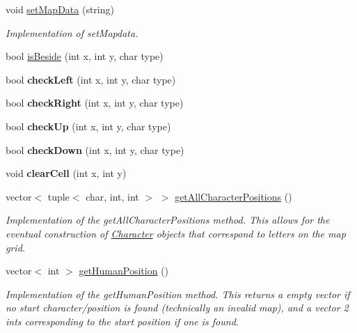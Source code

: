 \begin{DoxyCompactItemize}
void \hyperlink{class_map_a94074365bf7aaa7aef44607581f47f3e}{set\+Map\+Data} (string)
\begin{DoxyCompactList}\small\item\em Implementation of set\+Mapdata. \end{DoxyCompactList}\item 
bool \hyperlink{class_map_a7ba2837b589493924b726dc326d68e8e}{is\+Beside} (int x, int y, char type)
\item 
\hypertarget{class_map_a6f691b4374549e38a63bd0632b181287}{}\label{class_map_a6f691b4374549e38a63bd0632b181287} 
bool {\bfseries check\+Left} (int x, int y, char type)
\item 
\hypertarget{class_map_aa2cecf35b3b2442491382517461182ce}{}\label{class_map_aa2cecf35b3b2442491382517461182ce} 
bool {\bfseries check\+Right} (int x, int y, char type)
\item 
\hypertarget{class_map_ad127d109681542bf6a920e273011d771}{}\label{class_map_ad127d109681542bf6a920e273011d771} 
bool {\bfseries check\+Up} (int x, int y, char type)
\item 
\hypertarget{class_map_a14e26bb72e2de564b4fc866c6671a2a8}{}\label{class_map_a14e26bb72e2de564b4fc866c6671a2a8} 
bool {\bfseries check\+Down} (int x, int y, char type)
\item 
\hypertarget{class_map_acfb984ad6e0e10cbddc9aa24ee0fc749}{}\label{class_map_acfb984ad6e0e10cbddc9aa24ee0fc749} 
void {\bfseries clear\+Cell} (int x, int y)
\item 
\hypertarget{class_map_aeb83928090860eb04aa55d0584aaabf3}{}\label{class_map_aeb83928090860eb04aa55d0584aaabf3} 
vector$<$ tuple$<$ char, int, int $>$ $>$ \hyperlink{class_map_aeb83928090860eb04aa55d0584aaabf3}{get\+All\+Character\+Positions} ()
\begin{DoxyCompactList}\small\item\em Implementation of the get\+All\+Character\+Positions method. This allows for the eventual construction of \hyperlink{class_character}{Character} objects that correspond to letters on the map grid. \end{DoxyCompactList}\item 
\hypertarget{class_map_a971ac7686d5ac9e6d65b9b80599aec47}{}\label{class_map_a971ac7686d5ac9e6d65b9b80599aec47} 
vector$<$ int $>$ \hyperlink{class_map_a971ac7686d5ac9e6d65b9b80599aec47}{get\+Human\+Position} ()
\begin{DoxyCompactList}\small\item\em Implementation of the get\+Human\+Position method. This returns a empty vector if no start character/position is found (technically an invalid map), and a vector 2 ints corresponding to the start position if one is found. \end{DoxyCompactList}\item 

\end{DoxyCompactItemize}
